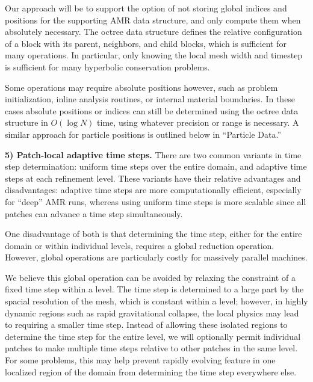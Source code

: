 \documentclass[10pt,twocolumn]{article}
\begin{document}
Our approach will be to support the option of not storing global
indices and positions for the supporting AMR data structure, and only
compute them when absolutely necessary.  The octree data structure
defines the relative configuration of a block with its parent,
neighbors, and child blocks, which is sufficient for many operations.
In particular, only knowing the local mesh width and timestep is
sufficient for many hyperbolic conservation problems.

Some operations may require absolute positions however, such as
problem initialization, inline analysis routines, or internal material
boundaries.  In these cases absolute positions or indices can still be
determined using the octree data structure in $O(\log N)$ time, using
whatever precision or range is necessary.  A similar approach for
particle positions is outlined below in ``Particle Data.''



\textbf{5) Patch-local adaptive time steps.} There are two common
variants in time step determination: uniform time steps over the
entire domain, and adaptive time steps at each refinement level.
These variants have their relative advantages and disadvantages:
adaptive time steps are more computationally efficient, especially for
``deep'' AMR runs, whereas using uniform time steps is more scalable
since all patches can advance a time step simultaneously.

One disadvantage of both is that determining the time step, either for
the entire domain or within individual levels, requires a global
reduction operation.  However, global operations are particularly costly for
massively parallel machines.  

We believe this global operation can be avoided by relaxing the
constraint of a fixed time step within a level.  The time step is
determined to a large part by the spacial resolution of the mesh,
which is constant within a level; however, in highly dynamic regions
such as rapid gravitational collapse, the local physics may lead to
requiring a smaller time step.  Instead of allowing these isolated
regions to determine the time step for the entire level, we will
optionally permit individual patches to make multiple time steps
relative to other patches in the same level.  For some problems, this
may help prevent rapidly evolving feature in one localized region of
the domain from determining the time step everywhere else.
\end{document}
